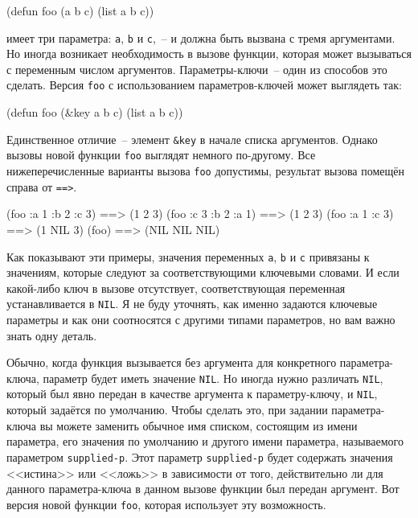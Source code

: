 \begin{myverb}
(defun foo (a b c) (list a b c))
\end{myverb}

\noindent{}имеет три параметра: \lstinline{a}, \lstinline{b} и \lstinline{c},~-- и должна быть вызвана с тремя
аргументами. Но иногда возникает необходимость в вызове функции, которая может вызываться
с переменным числом аргументов. Параметры-ключи~-- один из способов это сделать. Версия
\lstinline{foo} с использованием параметров-ключей может выглядеть так:

\begin{myverb}
(defun foo (&key a b c) (list a b c))
\end{myverb}

Единственное отличие~-- элемент \lstinline!&key! в начале списка аргументов. Однако вызовы
новой функции \lstinline{foo} выглядят немного по-другому. Все нижеперечисленные варианты
вызова \lstinline{foo} допустимы, результат вызова помещён справа от \lstinline!==>!.

\begin{myverb}
(foo :a 1 :b 2 :c 3)  ==> (1 2 3)
(foo :c 3 :b 2 :a 1)  ==> (1 2 3)
(foo :a 1 :c 3)       ==> (1 NIL 3)
(foo)                 ==> (NIL NIL NIL)
\end{myverb}

Как показывают эти примеры, значения переменных \lstinline{a}, \lstinline{b} и \lstinline{c} привязаны
к значениям, которые следуют за соответствующими ключевыми словами. И если какой-либо
ключ в вызове отсутствует, соответствующая переменная устанавливается в \lstinline{NIL}. Я не
буду уточнять, как именно задаются ключевые параметры и как они соотносятся с другими
типами параметров, но вам важно знать одну деталь.

Обычно, когда функция вызывается без аргумента для конкретного параметра-ключа, параметр
будет иметь значение \lstinline{NIL}. Но иногда нужно различать \lstinline{NIL}, который был явно
передан в качестве аргумента к параметру-ключу, и \lstinline{NIL}, который задаётся по
умолчанию. Чтобы сделать это, при задании параметра-ключа вы можете заменить обычное имя
списком, состоящим из имени параметра, его значения по умолчанию и другого имени
параметра, называемого параметром \lstinline{supplied-p}. Этот параметр \lstinline{supplied-p} будет
содержать значения <<истина>> или <<ложь>> в зависимости от того, действительно ли для
данного параметра-ключа в данном вызове функции был передан аргумент. Вот версия новой
функции \lstinline{foo}, которая использует эту возможность.

